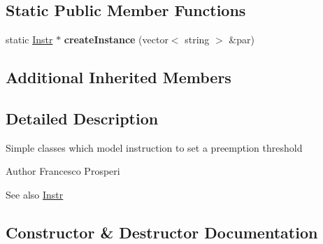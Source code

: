 \subsection*{Static Public Member Functions}
\begin{DoxyCompactItemize}
\item 
static \hyperlink{classRTSim_1_1Instr}{Instr} $\ast$ {\bfseries create\+Instance} (vector$<$ string $>$ \&par)\hypertarget{classRTSim_1_1ThreInstr_a4402eb215c5ea00193962a61c26760fa}{}\label{classRTSim_1_1ThreInstr_a4402eb215c5ea00193962a61c26760fa}

\end{DoxyCompactItemize}
\subsection*{Additional Inherited Members}


\subsection{Detailed Description}
Simple classes which model instruction to set a preemption threshold \begin{DoxyAuthor}{Author}
Francesco Prosperi 
\end{DoxyAuthor}
\begin{DoxySeeAlso}{See also}
\hyperlink{classRTSim_1_1Instr}{Instr} 
\end{DoxySeeAlso}


\subsection{Constructor \& Destructor Documentation}

